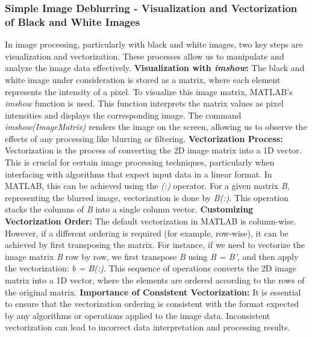 \documentclass[unicode,11pt,a4paper,oneside,numbers=endperiod,openany]{scrartcl}
\begin{document}
\subsubsection{Simple Image Deblurring - Visualization and Vectorization of Black and White Images}
In image processing, particularly with black and white images, two key steps are visualization and vectorization. These processes allow us to manipulate and analyze the image data effectively.
\newline\newline
\textbf{Visualization with \textit{imshow}:}
The black and white image under consideration is stored as a matrix, where each element represents the intensity of a pixel. To visualize this image matrix, MATLAB's \textit{imshow} function is used. This function interprets the matrix values as pixel intensities and displays the corresponding image. The command \textit{imshow(ImageMatrix)} renders the image on the screen, allowing us to observe the effects of any processing like blurring or filtering.
\newline\newline
\textbf{Vectorization Process:}
Vectorization is the process of converting the 2D image matrix into a 1D vector. This is crucial for certain image processing techniques, particularly when interfacing with algorithms that expect input data in a linear format. In MATLAB, this can be achieved using the \textit{(:)} operator. For a given matrix \textit{B}, representing the blurred image, vectorization is done by \textit{B(:)}. This operation stacks the columns of \textit{B} into a single column vector.
\newline\newline
\textbf{Customizing Vectorization Order:}
The default vectorization in MATLAB is column-wise. However, if a different ordering is required (for example, row-wise), it can be achieved by first transposing the matrix. For instance, if we need to vectorize the image matrix \textit{B} row by row, we first transpose \textit{B} using \textit{B = B'}, and then apply the vectorization: \textit{b = B(:)}. This sequence of operations converts the 2D image matrix into a 1D vector, where the elements are ordered according to the rows of the original matrix.
\newline\newline
\textbf{Importance of Consistent Vectorization:}
It is essential to ensure that the vectorization ordering is consistent with the format expected by any algorithms or operations applied to the image data. Inconsistent vectorization can lead to incorrect data interpretation and processing results.
\end{document}
